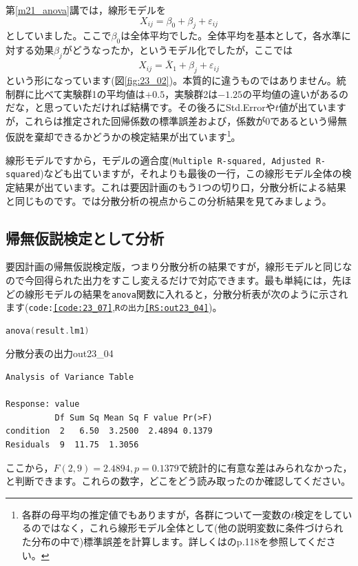 \documentclass{ltjbook}
\begin{document}
第\ref{m21_anova}講では，線形モデルを
\[ X_{ij} = \beta_0 + \beta_j + \varepsilon_{ij} \]
としていました。ここで$\beta_0$は全体平均でした。全体平均を基本として，各水準に対する効果$\beta_j$がどうなったか，というモデル化でしたが，ここでは
\[ X_{ij} = \bar{X}_1 + \beta_j + \varepsilon_{ij} \]
という形になっています(図\ref{fig:23_02})。本質的に違うものではありません。統制群に比べて実験群1の平均値は$+0.5$，実験群2は$-1.25$の平均値の違いがあるのだな，と思っていただければ結構です。その後ろにStd.Errorや$t$値が出ていますが，これらは推定された回帰係数の標準誤差および，係数が$0$であるという帰無仮説を棄却できるかどうかの検定結果が出ています\footnote{各群の母平均の推定値でもありますが，各群について一変数の$t$検定をしているのではなく，これら線形モデル全体として(他の説明変数に条件づけられた分布の中で)標準誤差を計算します。詳しくは\textcite{Haebara200206}のp.118を参照してください。}。

線形モデルですから，モデルの適合度(\texttt{Multiple R-squared, Adjusted R-squared})なども出ていますが，それよりも最後の一行，この線形モデル全体の検定結果が出ています。これは要因計画のもう1つの切り口，分散分析による結果と同じものです。では分散分析の視点からこの分析結果を見てみましょう。

\subsection{帰無仮説検定として分析}
要因計画の帰無仮説検定版，つまり分散分析の結果ですが，線形モデルと同じなので今回得られた出力をすこし変えるだけで対応できます。最も単純には，先ほどの線形モデルの結果を\texttt{anova}関数に入れると，分散分析表が次のように示されます(\texttt{code:\ref{code:23_07}},\texttt{Rの出力\ref{RS:out23_04}})。


\begin{lstlisting}[language=c++,label={code:23_07},caption={分散分析としてみる}]
anova(result.lm1)
\end{lstlisting}


\begin{Rscreen}{分散分表の出力}{out23_04}
	\begin{verbatim}
Analysis of Variance Table

Response: value
          Df Sum Sq Mean Sq F value Pr(>F)
condition  2   6.50  3.2500  2.4894 0.1379
Residuals  9  11.75  1.3056   
\end{verbatim}
\end{Rscreen}
ここから，$F(2,9)=2.4894,p=0.1379$で統計的に有意な差はみられなかった，と判断できます。これらの数字，どこをどう読み取ったのか確認してください。
\end{document}
